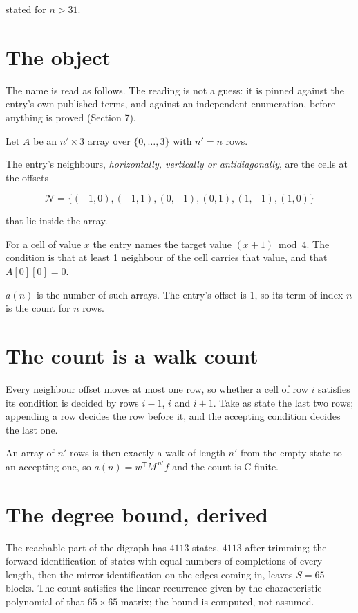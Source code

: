 \documentclass[11pt]{article}
\theoremstyle{definition}
\begin{document}
stated for $n > 31$.

\section{The object}

The name is read as follows. The reading is not a guess: it is pinned against the entry's own published terms, and against an independent enumeration, before anything is proved (Section 7).

Let $A$ be an $n' \times 3$ array over $\{0,\dots,3\}$ with $n' = n$ rows.

The entry's neighbours, {\itshape horizontally, vertically or antidiagonally}, are the cells at the offsets

\[\mathcal{N} = \{(-1,0), (-1,1), (0,-1), (0,1), (1,-1), (1,0)\}\]

that lie inside the array.

For a cell of value $x$ the entry names the target value $(x + 1) \bmod 4$. The condition is that at least 1 neighbour of the cell carries that value, and that $A[0][0] = 0$.

$a(n)$ is the number of such arrays. The entry's offset is 1, so its term of index $n$ is the count for $n$ rows.

\section{The count is a walk count}

Every neighbour offset moves at most one row, so whether a cell of row $i$ satisfies its condition is decided by rows $i-1$, $i$ and $i+1$. Take as state the last two rows; appending a row decides the row before it, and the accepting condition decides the last one.

An array of $n'$ rows is then exactly a walk of length $n'$ from the empty state to an accepting one, so $a(n) = w^{\mathsf T}M^{\,n'}f$ and the count is C-finite.

\section{The degree bound, derived}

The reachable part of the digraph has $4113$ states, $4113$ after trimming; the forward identification of states with equal numbers of completions of every length, then the mirror identification on the edges coming in, leaves $S = 65$ blocks. The count satisfies the linear recurrence given by the characteristic polynomial of that $65\times65$ matrix; the bound is computed, not assumed.
\end{document}
